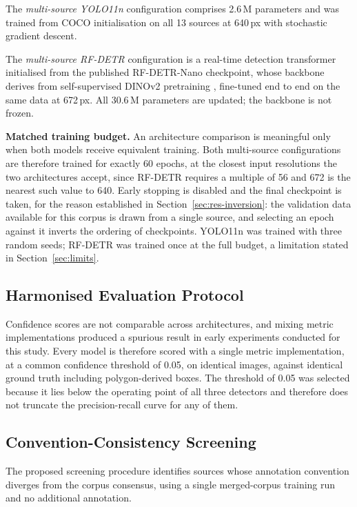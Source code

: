 The \emph{multi-source YOLO11n} configuration \cite{yolo11} comprises 2.6\,M
parameters and was trained from COCO initialisation \cite{lin2014coco} on all 13
sources at 640\,px with stochastic gradient descent.

The \emph{multi-source RF-DETR} configuration \cite{rfdetr} is a real-time detection
transformer initialised from the published RF-DETR-Nano checkpoint, whose backbone
derives from self-supervised DINOv2 pretraining \cite{dinov2}, fine-tuned end to end
on the same data at 672\,px. All 30.6\,M parameters are updated; the backbone is not
frozen.

\textbf{Matched training budget.} An architecture comparison is meaningful only when
both models receive equivalent training. Both multi-source configurations are
therefore trained for exactly 60 epochs, at the closest input resolutions the two
architectures accept, since RF-DETR requires a multiple of 56 and 672 is the nearest
such value to 640. Early stopping is disabled and the final checkpoint is taken, for
the reason established in Section~\ref{sec:res-inversion}: the validation data
available for this corpus is drawn from a single source, and selecting an epoch
against it inverts the ordering of checkpoints. YOLO11n was trained with three random
seeds; RF-DETR was trained once at the full budget, a limitation stated in
Section~\ref{sec:limits}.

\subsection{Harmonised Evaluation Protocol}

\noindent Confidence scores are not comparable across architectures, and mixing
metric implementations produced a spurious result in early experiments conducted
for this study. Every model is therefore scored with a single metric
implementation, at a common confidence threshold of 0.05, on identical images,
against identical ground truth including polygon-derived boxes. The threshold of
0.05 was selected because it lies below the operating point of all three
detectors and therefore does not truncate the precision-recall curve for any of
them.

\subsection{Convention-Consistency Screening}
\label{sec:screen}

\noindent The proposed screening procedure identifies sources whose annotation
convention diverges from the corpus consensus, using a single merged-corpus
training run and no additional annotation.

